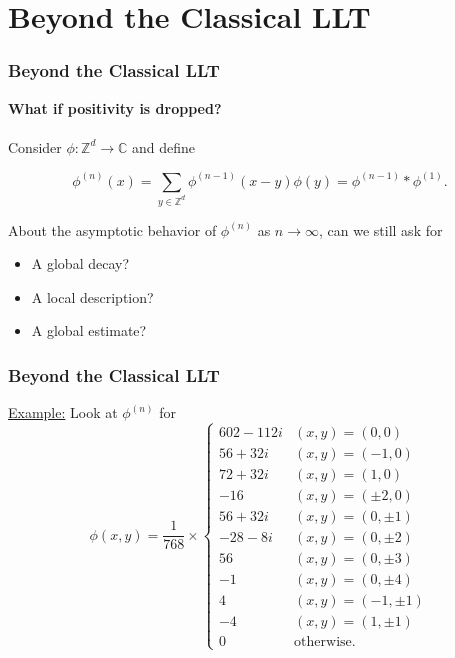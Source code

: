 \documentclass{beamer}
\theoremstyle{definition}
\begin{document}
\section{Beyond the Classical LLT}
\begin{frame}
\frametitle{Beyond the Classical LLT}
\textbf{What if positivity is dropped?}\\
$\,$\\

Consider $\phi: \mathbb{Z}^d \to \mathbb{C}$ and define 

\begin{equation*}
\phi^{(n)}(x)=\sum_{y\in\mathbb{Z}^d}\phi^{(n-1)}(x-y)\phi(y) = \phi^{(n-1)}\ast \phi^{(1)}.
\end{equation*}

%


About the asymptotic behavior of $\phi^{(n)}$ as $n\to \infty$, can we still ask for
\begin{itemize}
	\item A global decay?
	\item A local description?
	\item A global estimate?
\end{itemize}



\end{frame}

















\begin{frame}
\frametitle{Beyond the Classical LLT}

\underline{Example:} Look at $\phi^{(n)}$ for 
\begin{equation*}
\phi(x,y) = 
\frac{1}{768}\times
\begin{cases}
602 - 112i &(x,y) = (0,0)\\
56 + 32i   &(x,y) = (-1,0)\\
72 + 32i   &(x,y) = (1,0)\\
-16        &(x,y) = (\pm 2,0)\\
56 + 32i   &(x,y) = (0,\pm 1)\\
-28 - 8i   &(x,y) = (0,\pm 2)\\
56         &(x,y) = (0,\pm 3)\\
-1         &(x,y) = (0,\pm 4)\\
4          &(x,y) = (-1,\pm 1)\\
-4         &(x,y) = (1,\pm 1)\\
0          &\text{otherwise}.
\end{cases}
\end{equation*}
\end{frame}
\end{document}
